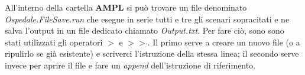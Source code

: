 All'interno della cartella \textbf{AMPL} si può trovare un file denominato \textit{Ospedale.FileSave.run} che esegue in serie tutti e tre gli scenari sopracitati e ne salva l'output in un file dedicato chiamato \textit{Output.txt}.
Per fare ciò, sono sono stati utilizzati gli operatori $>$ e $>>$. Il primo serve a creare un nuovo file (o a ripulirlo se già esistente) e scriverci l'istruzione della stessa linea; il secondo serve invece per aprire il file e fare un \textit{append} dell'istruzione di riferimento.